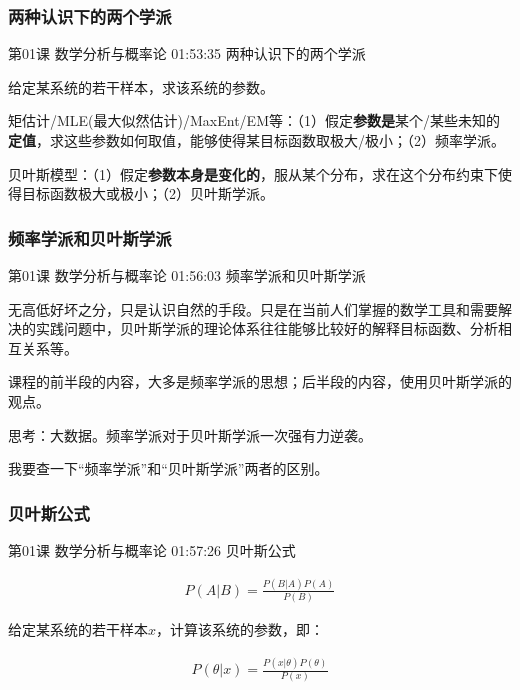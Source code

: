 \documentclass[UTF8]{ctexart}
\begin{document}
\subsubsection{两种认识下的两个学派}

第01课 数学分析与概率论 01:53:35 两种认识下的两个学派

给定某系统的若干样本，求该系统的参数。

矩估计/MLE(最大似然估计)/MaxEnt/EM等：（1）假定\textbf{参数是}某个/某些未知的\textbf{定值}，求这些参数如何取值，能够使得某目标函数取极大/极小；（2）频率学派。

贝叶斯模型：（1）假定\textbf{参数本身是变化的}，服从某个分布，求在这个分布约束下使得目标函数极大或极小；（2）贝叶斯学派。

\subsubsection{频率学派和贝叶斯学派}

第01课 数学分析与概率论 01:56:03 频率学派和贝叶斯学派

无高低好坏之分，只是认识自然的手段。只是在当前人们掌握的数学工具和需要解决的实践问题中，贝叶斯学派的理论体系往往能够比较好的解释目标函数、分析相互关系等。

课程的前半段的内容，大多是频率学派的思想；后半段的内容，使用贝叶斯学派的观点。

思考：大数据。频率学派对于贝叶斯学派一次强有力逆袭。

我要查一下“频率学派”和“贝叶斯学派”两者的区别。

\subsubsection{贝叶斯公式}

第01课 数学分析与概率论 01:57:26 贝叶斯公式

\begin{equation}
\begin{aligned}
P(A|B)=\frac{P(B|A)P(A)}{P(B)}
\end{aligned}
\end{equation}

给定某系统的若干样本$x$，计算该系统的参数，即：

\begin{equation}
\begin{aligned}
P(\theta|x)=\frac{P(x|\theta)P(\theta)}{P(x)}
\end{aligned}
\end{equation}
\end{document}
